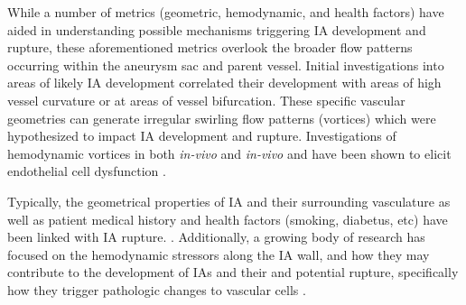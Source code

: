 While a number of metrics (geometric, hemodynamic, and health factors) have aided in understanding possible mechanisms triggering IA development and rupture, these aforementioned metrics overlook the broader flow patterns occurring within the aneurysm sac and parent vessel. Initial investigations into areas of likely IA development correlated their development with areas of high vessel curvature or at areas of vessel bifurcation. These specific vascular geometries can generate irregular swirling flow patterns (vortices) which were hypothesized to impact IA development and rupture. Investigations of hemodynamic vortices in both \textit{in-vivo} and \textit{in-vivo} and have been shown to elicit endothelial cell dysfunction \cite{balaguru2016disturbed,mannino2015yourself,nowicki2014novel}.


Typically, the geometrical properties of IA and their surrounding vasculature as well as patient medical history and health factors (smoking, diabetus, etc) \cite{Backes951} have been linked with IA rupture. \cite{Steiner_2018,Thompson2015guidelines}. Additionally, a growing body of research has focused on the hemodynamic stressors along the IA wall, and how they may contribute to the development of IAs and their and potential rupture, specifically how they trigger pathologic changes to vascular cells \cite{baek2009flow,dolan2013high,byrne2014quantifying,cecchi2011role,kulcsar2011hemodynamics}. 


